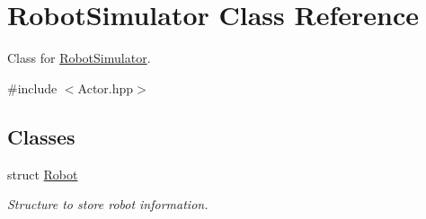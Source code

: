 \hypertarget{classRobotSimulator}{\section{Robot\-Simulator Class Reference}
\label{classRobotSimulator}
}


Class for \hyperlink{classRobotSimulator}{Robot\-Simulator}.  




{\ttfamily \#include $<$Actor.\-hpp$>$}

\subsection*{Classes}
\begin{DoxyCompactItemize}
\item 
struct \hyperlink{structRobotSimulator_1_1Robot}{Robot}
\begin{DoxyCompactList}\small\item\em Structure to store robot information. \end{DoxyCompactList}\end{DoxyCompactItemize}
